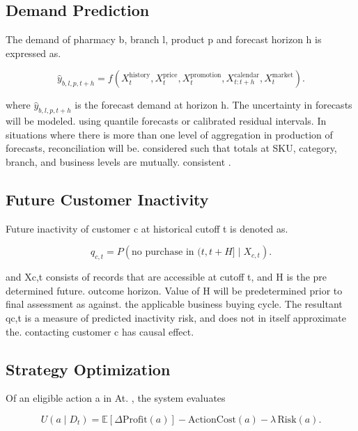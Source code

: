 \documentclass[a4paper,11pt,oneside]{book}
\theoremstyle{plain}
\theoremstyle{definition}
\theoremstyle{remark}
\begin{document}
\subsection{Demand Prediction}
\label{subsec:demand_prediction}

The demand of pharmacy b, branch l, product p and forecast horizon h is expressed as.

\begin{equation}
\hat{y}_{b,l,p,t+h}=f\!\left(X^{\mathrm{history}}_t,X^{\mathrm{price}}_t,X^{\mathrm{promotion}}_t,X^{\mathrm{calendar}}_{t:t+h},X^{\mathrm{market}}_t\right).
\label{eq:demand}
\end{equation}

where \(\hat{y}_{b,l,p,t+h}\) is the forecast demand at horizon h. The uncertainty in forecasts will be modeled. using quantile forecasts or calibrated residual intervals. In situations where there is more than one level of aggregation in production of forecasts, reconciliation will be. considered such that totals at SKU, category, branch, and business levels are mutually. consistent \cite{hyndman2011hierarchical}.

\subsection{Future Customer Inactivity}
\label{subsec:customer_inactivity}

Future inactivity of customer c at historical cutoff t is denoted as.

\begin{equation}
q_{c,t}=P\!\left(\text{no purchase in }(t,t+H]\mid X_{c,t}\right).
\label{eq:churn}
\end{equation}

and Xc,t consists of records that are accessible at cutoff t, and H is the pre determined future. outcome horizon. Value of H will be predetermined prior to final assessment as against. the applicable business buying cycle. The resultant qc,t is a measure of predicted inactivity risk, and does not in itself approximate the. contacting customer c has causal effect.

\subsection{Strategy Optimization}
\label{subsec:strategy_optimization}

Of an eligible action a in At. , the system evaluates

\begin{equation}
U(a\mid D_t)=\mathbb{E}\!\left[\Delta\mathrm{Profit}(a)\right]-\mathrm{ActionCost}(a)-\lambda\,\mathrm{Risk}(a).
\label{eq:utility}
\end{equation}
\end{document}
